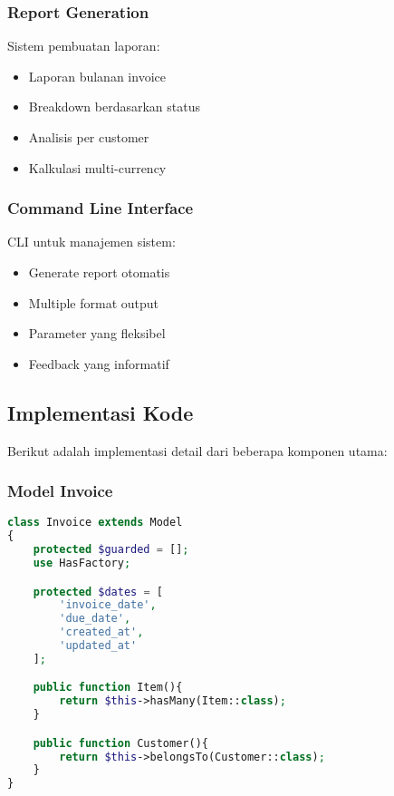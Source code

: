 \documentclass[a4paper]{report}
\begin{document}
\subsubsection{Report Generation}
Sistem pembuatan laporan:
\begin{itemize}
\item Laporan bulanan invoice
\item Breakdown berdasarkan status
\item Analisis per customer
\item Kalkulasi multi-currency
\end{itemize}

\subsubsection{Command Line Interface}
CLI untuk manajemen sistem:
\begin{itemize}
\item Generate report otomatis
\item Multiple format output
\item Parameter yang fleksibel
\item Feedback yang informatif
\end{itemize}

\subsection{Implementasi Kode}
Berikut adalah implementasi detail dari beberapa komponen utama:

\subsubsection{Model Invoice}
\begin{lstlisting}[language=PHP]
class Invoice extends Model
{
    protected $guarded = [];
    use HasFactory;

    protected $dates = [
        'invoice_date',
        'due_date',
        'created_at',
        'updated_at'
    ];

    public function Item(){
        return $this->hasMany(Item::class);
    }

    public function Customer(){
        return $this->belongsTo(Customer::class);
    }
}
\end{lstlisting}
\end{document}
